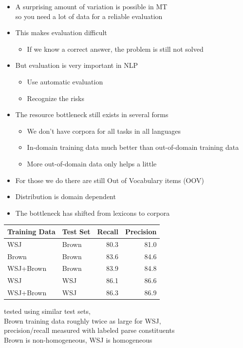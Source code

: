 \documentclass[a4paper,landscape,headrule,footrule,xetex]{foils}
\begin{document}
\begin{itemize}
\item A surprising amount of variation is possible in MT
  \\ so you need a lot of data for a reliable evaluation
\item This makes evaluation difficult
  \begin{itemize}
  \item If we know a correct answer, the problem is still not solved
  \end{itemize}
\item But evaluation is very important in NLP
  \begin{itemize}
  \item Use automatic evaluation
  \item Recognize the risks
  \end{itemize}
\end{itemize}



\begin{itemize}
\item The resource bottleneck still exists in several forms
  \begin{itemize}
  \item We don't have corpora for all tasks in all languages
  \item In-domain training data much better than out-of-domain training data
  \item More out-of-domain data only helps a little
  \end{itemize}
\item For those we do there are still Out of Vocabulary items (OOV)
\item Distribution is domain dependent
\item The bottleneck has shifted from lexicons to corpora
\end{itemize}


\begin{center}
  \begin{tabular}{ll|rr}
    Training Data & Test Set & Recall & Precision \\
    \hline
    WSJ & Brown &   80.3 & 81.0 \\
    Brown & Brown & 83.6 & 84.6 \\ 
    WSJ+Brown & Brown & 83.9 & 84.8 \\ 
    WSJ & WSJ & 86.1 & 86.6 \\
    WSJ+Brown & WSJ & 86.3 & 86.9 \\ 
  \end{tabular}
  \begin{flushleft}
    tested using similar test sets,
    \\ Brown training data roughly twice as large for WSJ,
    \\ precision/recall measured with labeled parse constituents
    \\ Brown is non-homogeneous, WSJ is homogeneous
  \end{flushleft}
\end{center}
\end{document}

